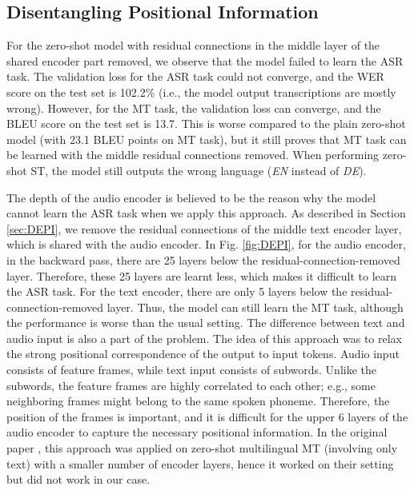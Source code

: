 \documentclass[conference]{IEEEtran}
\begin{document}
	\subsection{Disentangling Positional Information}
	For the zero-shot model with residual connections in the middle layer of the shared encoder part removed, we observe that the model failed to learn the ASR task. The validation loss for the ASR task could not converge, and the WER score on the test set is 102.2\% (i.e., the model output transcriptions are mostly wrong). However, for the MT task, the validation loss can converge, and the BLEU score on the test set is 13.7. This is worse compared to the plain zero-shot model (with 23.1 BLEU points on MT task), but it still proves that MT task can be learned with the middle residual connections removed. When performing zero-shot ST, the model still outputs the wrong language (\textit{EN} instead of \textit{DE}).
	
	
	The depth of the audio encoder is believed to be the reason why the model cannot learn the ASR task when we apply this approach. As described in Section \ref{sec:DEPI}, we remove the residual connections of the middle text encoder layer, which is shared with the audio encoder. In Fig. \ref{fig:DEPI}, for the audio encoder, in the backward pass, there are 25 layers below the residual-connection-removed layer. Therefore, these 25 layers are learnt less, which makes it difficult to learn the ASR task. For the text encoder, there are only 5 layers below the residual-connection-removed layer. Thus, the model can still learn the MT task, although the performance is worse than the usual setting. The difference between text and audio input is also a part of the problem. The idea of this approach was to relax the strong positional correspondence of the output to input tokens. Audio input consists of feature frames, while text input consists of subwords. Unlike the subwords, the feature frames are highly correlated to each other; e.g., some neighboring frames might belong to the same spoken phoneme. Therefore, the position of the frames is important, and it is difficult for the upper 6 layers of the audio encoder to capture the necessary positional information. In the original paper \cite{DEPI}, this approach was applied on zero-shot multilingual MT (involving only text) with a smaller number of encoder layers, hence it worked on their setting but did not work in our case.
	
\end{document}
